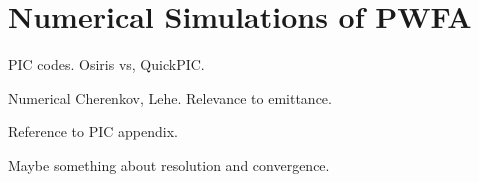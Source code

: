
\section{Numerical Simulations of PWFA}
\label{Int:Sim}

PIC codes. Osiris vs, QuickPIC.

Numerical Cherenkov, Lehe. Relevance to emittance.

Reference to PIC appendix.

Maybe something about resolution and convergence.

